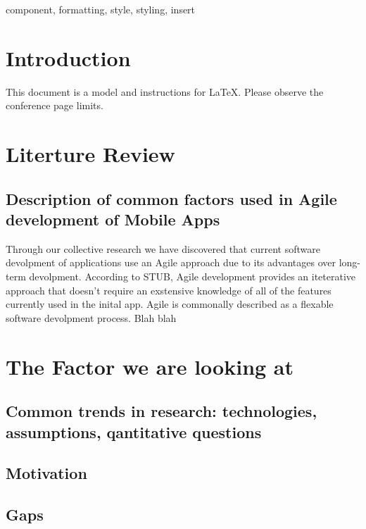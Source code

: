 \documentclass[conference]{IEEEtran}
\begin{document}
\begin{IEEEkeywords}
component, formatting, style, styling, insert
\end{IEEEkeywords}

\section{Introduction}
This document is a model and instructions for \LaTeX.
Please observe the conference page limits. 

\section{Literture Review}

\subsection{Description of common factors used in Agile development of Mobile Apps}
Through our collective research we have discovered that current software devolpment of applications
use an Agile approach due to its advantages over long-term devolpment. According to STUB,
Agile development provides an iteterative approach that doesn't require an exstensive knowledge of 
all of the features currently used in the inital app. Agile is commonally described as a flexable software
devolpment process.  Blah blah

\section{The Factor we are looking at}


\subsection{Common trends in research: technologies, assumptions, qantitative questions}\label{AA}


\subsection{Motivation}


\subsection{Gaps}
\end{document}
